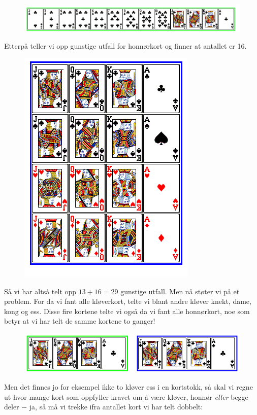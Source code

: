 	\begin{figure}[H]
		\centering
		\includegraphics[scale=0.45]{kort1}
	\end{figure}
	Etterpå teller vi opp gunstige utfall for honnørkort og finner at 
	antallet er 16. \\
	\begin{figure}[H]
		\centering
		\includegraphics[scale=0.45]{kort2}
	\end{figure}
Så vi har altså telt opp ${13+16=29}$ gunstige utfall. Men nå støter vi på et problem. For da vi fant alle kløverkort, telte vi blant andre kløver knekt, dame, kong og ess. Disse fire kortene telte vi også da vi fant alle honnørkort, noe som betyr at vi har telt de samme kortene to ganger! \\
	\begin{figure}[H]
		\centering
		\includegraphics[scale=0.45]{kort4}
	\end{figure}
Men det finnes jo for eksempel ikke to kløver ess i en kortstokk, så skal vi regne ut hvor mange kort som oppfyller kravet om å være kløver, honnør \textsl{eller} begge deler $ - $ ja, så må vi trekke ifra antallet kort vi har telt dobbelt:
